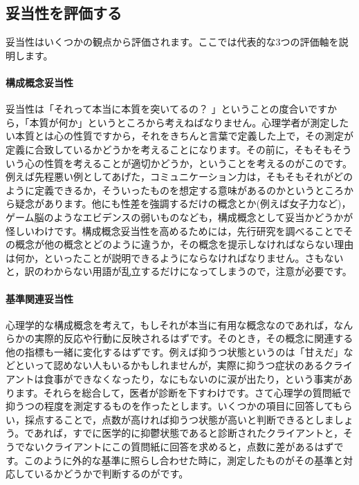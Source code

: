 \documentclass{ltjbook}
\begin{document}
\subsection{妥当性を評価する}
妥当性はいくつかの観点から評価されます。ここでは代表的な3つの評価軸を説明します。
\paragraph{構成概念妥当性} 妥当性は「それって本当に本質を突いてるの？ 」ということの度合いですから，「本質が何か」というところから考えねばなりません。心理学者が測定したい本質とは心の性質ですから，それをきちんと言葉で定義した上で，その測定が定義に合致しているかどうかを考えることになります。その前に，そもそもそういう心の性質を考えることが適切かどうか，ということを考えるのがこのです。例えば先程悪い例としてあげた，コミュニケーション力は，そもそもそれがどのように定義できるか，そういったものを想定する意味があるのかというところから疑念があります。他にも性差を強調するだけの概念とか(例えば女子力など)，ゲーム脳のようなエビデンスの弱いものなども，構成概念として妥当かどうかが怪しいわけです。構成概念妥当性を高めるためには，先行研究を調べることでその概念が他の概念とどのように違うか，その概念を提示しなければならない理由は何か，といったことが説明できるようにならなければなりません。さもないと，訳のわからない用語が乱立するだけになってしまうので，注意が必要です。

\paragraph{基準関連妥当性}心理学的な構成概念を考えて，もしそれが本当に有用な概念なのであれば，なんらかの実際的反応や行動に反映されるはずです。そのとき，その概念に関連する他の指標も一緒に変化するはずです。例えば抑うつ状態というのは「甘えだ」などといって認めない人もいるかもしれませんが，実際に抑うつ症状のあるクライアントは食事ができなくなったり，なにもないのに涙が出たり，という事実があります。それらを総合して，医者が診断を下すわけです。さて心理学の質問紙で抑うつの程度を測定するものを作ったとします。いくつかの項目に回答してもらい，採点することで，点数が高ければ抑うつ状態が高いと判断できるとしましょう。であれば，すでに医学的に抑鬱状態であると診断されたクライアントと，そうでないクライアントにこの質問紙に回答を求めると，点数に差があるはずです。このように外的な基準に照らし合わせた時に，測定したものがその基準と対応しているかどうかで判断するのがです。
\end{document}
